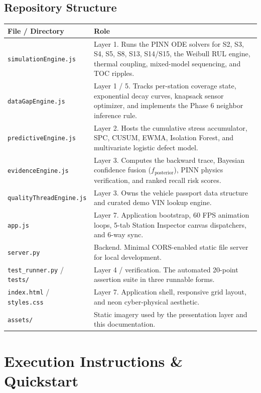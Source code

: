 \documentclass[11pt]{article}
\begin{document}
\subsection{Repository Structure}

\begin{center}
\small
\begin{tabular}{p{4.2cm}p{8.5cm}}
\toprule
\textbf{File / Directory} & \textbf{Role} \\
\midrule
\texttt{simulationEngine.js} & Layer 1. Runs the PINN ODE solvers for S2, S3, S4, S5, S8, S13, S14/S15, the Weibull RUL engine, thermal coupling, mixed-model sequencing, and TOC ripples. \\[3pt]
\texttt{dataGapEngine.js} & Layer 1 / 5. Tracks per-station coverage state, exponential decay curves, knapsack sensor optimizer, and implements the Phase 6 neighbor inference rule. \\[3pt]
\texttt{predictiveEngine.js} & Layer 2. Hosts the cumulative stress accumulator, SPC, CUSUM, EWMA, Isolation Forest, and multivariate logistic defect model. \\[3pt]
\texttt{evidenceEngine.js} & Layer 3. Computes the backward trace, Bayesian confidence fusion ($f_{\text{posterior}}$), PINN physics verification, and ranked recall risk scores. \\[3pt]
\texttt{qualityThreadEngine.js} & Layer 3. Owns the vehicle passport data structure and curated demo VIN lookup engine. \\[3pt]
\texttt{app.js} & Layer 7. Application bootstrap, 60 FPS animation loops, 5-tab Station Inspector canvas dispatchers, and 6-way sync. \\[3pt]
\texttt{server.py} & Backend. Minimal CORS-enabled static file server for local development. \\[3pt]
\texttt{test\_runner.py} / \texttt{tests/} & Layer 4 / verification. The automated 20-point assertion suite in three runnable forms. \\[3pt]
\texttt{index.html} / \texttt{styles.css} & Layer 7. Application shell, responsive grid layout, and neon cyber-physical aesthetic. \\[3pt]
\texttt{assets/} & Static imagery used by the presentation layer and this documentation. \\
\bottomrule
\end{tabular}
\end{center}

\section{Execution Instructions \& Quickstart}
\end{document}

